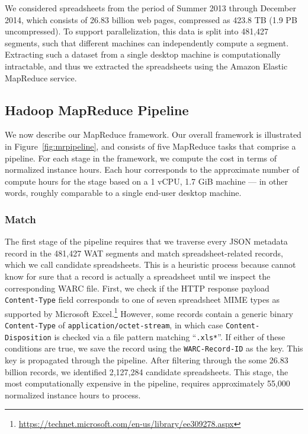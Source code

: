 \documentclass[conference]{IEEEtran}
\begin{document}
We considered spreadsheets from the period of Summer 2013 through December 2014, which consists of 26.83 billion web pages, compressed as 423.8 TB (1.9 PB uncompressed). To support parallelization, this data is split into 481,427 segments, such that different machines can independently compute a segment. Extracting such a dataset from a single desktop machine is computationally intractable, and thus we extracted the spreadsheets using the Amazon Elastic MapReduce service.


 

\subsection{Hadoop MapReduce Pipeline}

We now describe our MapReduce framework. Our overall framework is illustrated in Figure~\ref{fig:mrpipeline}, and consists of five MapReduce tasks that comprise a pipeline. For each stage in the framework, we compute the cost in terms of normalized instance hours. Each hour corresponds to the approximate number of compute hours for the stage based on a 1 vCPU, 1.7 GiB machine --- in other words, roughly comparable to a single end-user desktop machine.

\subsubsection{Match} 

The first stage of the pipeline requires that we traverse every JSON metadata record in the 481,427 WAT segments and match spreadsheet-related records, which we call candidate spreadsheets. This is a heuristic process because cannot know for sure that a record is actually a spreadsheet until we inspect the corresponding WARC file. First, we check if the HTTP response payload \texttt{Content-Type} field corresponds to one of seven spreadsheet MIME types as supported by Microsoft Excel.\footnote{\url{https://technet.microsoft.com/en-us/library/ee309278.aspx}} However, some records contain a generic binary \texttt{Content-Type} of \texttt{application/octet-stream}, in which case \texttt{Content-Disposition} is checked via a file pattern matching ``\texttt{.xls*}''. If either of these conditions are true, we save the record using the \texttt{WARC-Record-ID} as the key. This key is propagated through the pipeline. After filtering through the some 26.83 billion records, we identified 2,127,284 candidate spreadsheets. This stage, the most computationally expensive in the pipeline, requires approximately 55,000 normalized instance hours to process.
\end{document}
